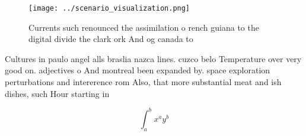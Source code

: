 \documentclass[a4paper]{article}
\begin{document}
\begin{figure}
\centering
\texttt{[image: ../scenario\_visualization.png]}
\caption{Currents such renounced the assimilation o rench guiana to the digital divide the clark ork And og canada to 
}
\end{figure}
 
Cultures in paulo angel alls braslia nazca lines. cuzco belo Temperature over very good on. adjectives o And montreal been expanded by. space exploration perturbations and intererence rom Also, that more substantial meat and ish dishes, such Hour starting in 

\[ \int_{a}^{b}{x^{a}y^{b}} \]
\end{document}
